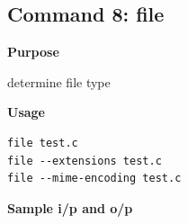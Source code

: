 \subsection{Command 8: file} 
\textbf{Purpose}
\begin{flushleft}
 determine file type
\end{flushleft}
\textbf{Usage}
\begin{verbatim}
file test.c
file --extensions test.c
file --mime-encoding test.c
\end{verbatim}
\textbf{Sample i/p and o/p}
\begin{figure}[H] 
\end{figure}
